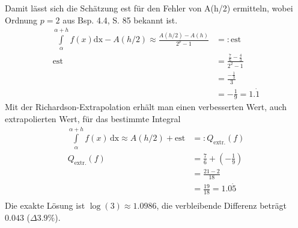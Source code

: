 \documentclass[10pt,a4paper]{article}
\begin{document}
	Damit lässt sich die Schätzung est für den Fehler von A(h/2) ermitteln, wobei Ordnung $p=2$ aus Bsp. 4.4, S. 85 bekannt ist.
	\begin{align*}
		\int\limits_{\alpha}^{\alpha+h}f(x)\text{dx}-A(h/2)\approx \frac{A(h/2)-A(h)}{2^p-1}&=:\text{est} \tag{4.92, S. 100} \\
		\text{est}&=\frac{\frac{7}{6}-\frac{4}{3}}{2^2-1} \\
		&=\frac{-\frac{1}{3}}{3} \\
		&=-\frac{1}{9} = 1.\dot{1}
	\end{align*}
	Mit der Richardson-Extrapolation erhält man einen verbesserten Wert, auch extrapolierten Wert, für das bestimmte Integral
	\begin{align*}
		\int\limits_{\alpha}^{\alpha+h}f(x)\,\text{dx}\approx A(h/2)+\text{est}&=:Q_{\text{extr.}}(f) \\
		Q_{\text{extr.}}(f)&=\frac{7}{6}+\left(-\frac{1}{9} \right) \\
		&=\frac{21-2}{18} \\
		&=\frac{19}{18}=1.0\dot{5} \\
	\end{align*}
	Die exakte Lösung ist $\log(3)\approx1.0986$, die verbleibende Differenz beträgt $0.043$ ($\Delta3.9\%$).
\end{document}
